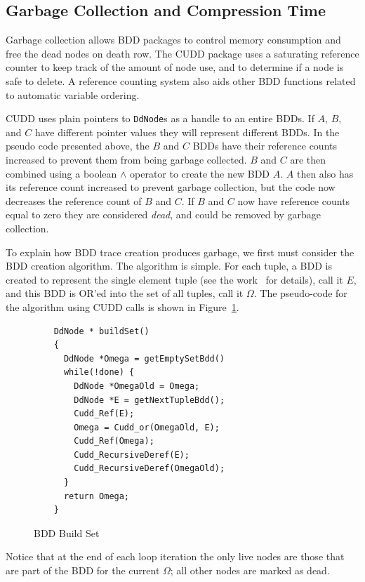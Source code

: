 \documentclass[defaultstyle,11pt]{thesis}
\begin{document}
\subsection{Garbage Collection and Compression Time}

Garbage collection allows BDD packages to control memory consumption
and free the dead nodes on death row.  The CUDD package uses a
saturating reference counter to keep track of the amount of node use,
and to determine if a node is safe to delete.  A reference counting
system also aids other BDD functions related to automatic variable
ordering.  

CUDD uses plain pointers to \texttt{DdNode}s as a handle to an entire
BDDs.  If $A$, $B$, and $C$ have different pointer values they will
represent different BDDs.  In the pseudo code presented above, the $B$
and $C$ BDDs have their reference counts increased to prevent them
from being garbage collected.  $B$ and $C$ are then combined using a
boolean $\land$ operator to create the new BDD $A$.  $A$ then also has
its reference count increased to prevent garbage collection, but the
code now decreases the reference count of $B$ and $C$.  If $B$ and $C$
now have reference counts equal to zero they are considered
\textit{dead}, and could be removed by garbage collection.

To explain how BDD trace creation produces garbage, we first must
consider the BDD creation algorithm.  The algorithm is simple.  For
each tuple, a BDD is created to represent the single element tuple
(see the work~\cite{price:06:cal} for details), call it $E$, and this
BDD is OR'ed into the set of all tuples, call it $\Omega$.  The
pseudo-code for the algorithm using CUDD calls is shown in
Figure~\ref{fig:bddbuildset}.

\begin{figure}
  \begin{lstlisting}
    DdNode * buildSet()
    {
      DdNode *Omega = getEmptySetBdd()
      while(!done) {
        DdNode *OmegaOld = Omega;
        DdNode *E = getNextTupleBdd(); 
        Cudd_Ref(E);
        Omega = Cudd_or(OmegaOld, E);
        Cudd_Ref(Omega);
        Cudd_RecursiveDeref(E);
        Cudd_RecursiveDeref(OmegaOld);
      }
      return Omega;
    }
\end{lstlisting}
\caption{BDD Build Set}
\label{fig:bddbuildset}
\end{figure}

Notice that at the end of each loop iteration the only live nodes are
those that are part of the BDD for the current $\Omega$; all other
nodes are marked as dead.
\end{document}
